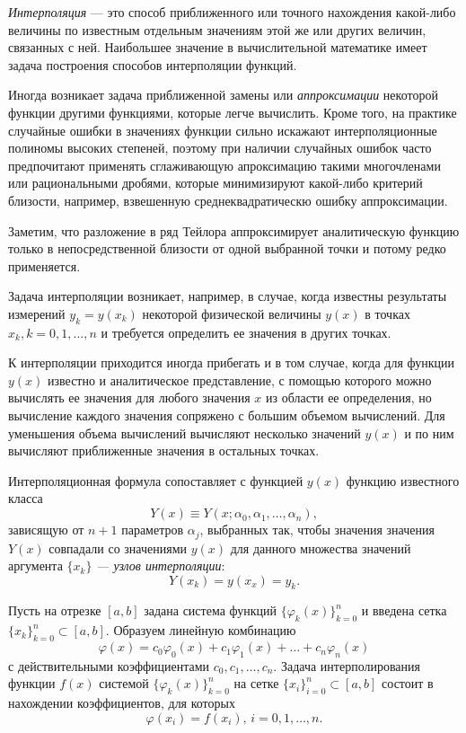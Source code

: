 

\Theory


\emph{Интерполяция} --- это способ приближенного или точного
нахождения какой-либо величины по известным отдельным значениям этой
же или других величин, связанных с ней. Наибольшее значение в
вычислительной математике имеет задача построения способов
интерполяции функций.

Иногда возникает задача приближенной замены или
\emph{аппроксимации}\emph{ }некоторой функции
другими функциями, которые легче вычислить. Кроме того, на практике
случайные ошибки в значениях функции сильно искажают интерполяционные
полиномы высоких степеней, поэтому при наличии случайных ошибок часто
предпочитают применять сглаживающую апроксимацию такими многочленами
или рациональными дробями, которые минимизируют какой-либо критерий
близости, например, взвешенную среднеквадратическю ошибку
аппроксимации.

Заметим, что разложение в ряд Тейлора аппроксимирует аналитическую
функцию только в непосредственной близости от одной выбранной точки и
потому редко применяется.

Задача интерполяции возникает, например, в случае, когда известны
результаты измерений $y_{k}=y(x_{k})$ некоторой физической величины
$y(x)$ в точках $x_{k},k=0,1,\dots,n$ и требуется определить ее
значения в других точках.

К интерполяции приходится иногда прибегать и в том случае, когда для
функции $y(x)$ известно и аналитическое представление, с помощью
которого можно вычислять ее значения для любого значения $x$ из
области ее определения, но вычисление каждого значения сопряжено с
большим объемом вычислений. Для уменьшения объема вычислений вычисляют
несколько значений $y(x)$ и по ним вычисляют приближенные значения в
остальных точках.

Интерполяционная формула сопоставляет с функцией $y(x)$ функцию
известного класса
\[
Y(x)\equiv Y(x;\alpha_{0},\alpha_{1},\dots,\alpha_{n}),
\]
зависящую от $n+1$ параметров $\alpha_{j}$, выбранных так, чтобы
значения значения $Y(x)$ совпадали со значениями $y(x)$ для данного
множества значений аргумента $\{x_{k}\}$ \emph{--- узлов
  интерполяции}:
\[
Y(x_{k})=y(x_{x})=y_{k}.
\]


Пусть на отрезке $[a,b]$ задана система функций
$\{\varphi_{k}(x)\}_{k=0}^{n}$ и введена сетка
$\{x_{k}\}_{k=0}^{n}\subset[a,b]$. Образуем линейную комбинацию
\[
\varphi(x)=c_{0}\varphi_{0}(x)+c_{1}\varphi_{1}(x)+\dots+c_{n}\varphi_{n}(x)
\]
с действительными коэффициентами $c_{0},c_{1},\dots,c_{n}$. Задача
интерполирования функции $f(x)$ системой
$\{\varphi_{k}(x)\}_{k=0}^{n}$ на сетке
$\{x_{i}\}_{i=0}^{n}\subset[a,b]$ состоит в нахождении коэффициентов,
для которых
\[
\varphi(x_{i})=f(x_{i}),\, i=0,1,\dots,n.
\]


